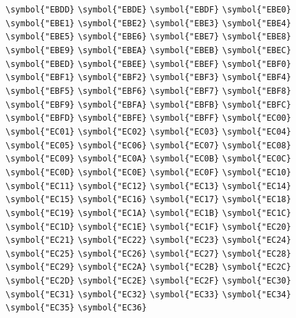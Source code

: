 \documentclass{ctexbook}
\begin{document}
 \verb|\symbol{"EBDD}|  \verb|\symbol{"EBDE}|  \verb|\symbol{"EBDF}|  \verb|\symbol{"EBE0}|  \verb|\symbol{"EBE1}|  \verb|\symbol{"EBE2}|  \verb|\symbol{"EBE3}|  \verb|\symbol{"EBE4}|  \verb|\symbol{"EBE5}|  \verb|\symbol{"EBE6}|  \verb|\symbol{"EBE7}|  \verb|\symbol{"EBE8}|  \verb|\symbol{"EBE9}|  \verb|\symbol{"EBEA}|  \verb|\symbol{"EBEB}|  \verb|\symbol{"EBEC}|  \verb|\symbol{"EBED}|  \verb|\symbol{"EBEE}|  \verb|\symbol{"EBEF}|  \verb|\symbol{"EBF0}|  \verb|\symbol{"EBF1}|  \verb|\symbol{"EBF2}|  \verb|\symbol{"EBF3}|  \verb|\symbol{"EBF4}|  \verb|\symbol{"EBF5}|  \verb|\symbol{"EBF6}|  \verb|\symbol{"EBF7}|  \verb|\symbol{"EBF8}|  \verb|\symbol{"EBF9}|  \verb|\symbol{"EBFA}|  \verb|\symbol{"EBFB}|  \verb|\symbol{"EBFC}|  \verb|\symbol{"EBFD}|  \verb|\symbol{"EBFE}|  \verb|\symbol{"EBFF}|  \verb|\symbol{"EC00}|  \verb|\symbol{"EC01}|  \verb|\symbol{"EC02}|  \verb|\symbol{"EC03}|  \verb|\symbol{"EC04}|  \verb|\symbol{"EC05}|  \verb|\symbol{"EC06}|  \verb|\symbol{"EC07}|  \verb|\symbol{"EC08}|  \verb|\symbol{"EC09}|  \verb|\symbol{"EC0A}|  \verb|\symbol{"EC0B}|  \verb|\symbol{"EC0C}|  \verb|\symbol{"EC0D}|  \verb|\symbol{"EC0E}|  \verb|\symbol{"EC0F}|  \verb|\symbol{"EC10}|  \verb|\symbol{"EC11}|  \verb|\symbol{"EC12}|  \verb|\symbol{"EC13}|  \verb|\symbol{"EC14}|  \verb|\symbol{"EC15}|  \verb|\symbol{"EC16}|  \verb|\symbol{"EC17}|  \verb|\symbol{"EC18}|  \verb|\symbol{"EC19}|  \verb|\symbol{"EC1A}|  \verb|\symbol{"EC1B}|  \verb|\symbol{"EC1C}|  \verb|\symbol{"EC1D}|  \verb|\symbol{"EC1E}|  \verb|\symbol{"EC1F}|  \verb|\symbol{"EC20}|  \verb|\symbol{"EC21}|  \verb|\symbol{"EC22}|  \verb|\symbol{"EC23}|  \verb|\symbol{"EC24}|  \verb|\symbol{"EC25}|  \verb|\symbol{"EC26}|  \verb|\symbol{"EC27}|  \verb|\symbol{"EC28}|  \verb|\symbol{"EC29}|  \verb|\symbol{"EC2A}|  \verb|\symbol{"EC2B}|  \verb|\symbol{"EC2C}|  \verb|\symbol{"EC2D}|  \verb|\symbol{"EC2E}|  \verb|\symbol{"EC2F}|  \verb|\symbol{"EC30}|  \verb|\symbol{"EC31}|  \verb|\symbol{"EC32}|  \verb|\symbol{"EC33}|  \verb|\symbol{"EC34}|  \verb|\symbol{"EC35}|  \verb|\symbol{"EC36}| 
\end{document}
